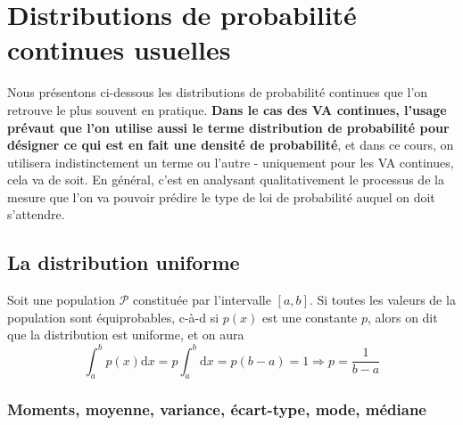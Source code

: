 \section{Distributions de probabilité continues usuelles}

Nous présentons ci-dessous les distributions de probabilité continues que l'on retrouve le plus souvent en pratique. {\bf Dans le cas des VA continues, l'usage prévaut que l'on utilise aussi le terme distribution de probabilité pour désigner ce qui est en fait une densité de probabilité}, et dans ce cours, on utilisera indistinctement un terme ou l'autre - uniquement pour les VA continues, cela va de soit. En général, c'est en analysant qualitativement le processus de la mesure que l'on va pouvoir prédire le type de loi de probabilité auquel on doit s'attendre.

\subsection{La distribution uniforme}

Soit une population $\mathcal{P}$ constituée par l'intervalle $[a,b]$. Si toutes les valeurs de la population sont équiprobables, c-à-d si $p(x)$ est une constante $p$, alors on dit que la distribution est uniforme, et on aura
\begin{equation}
\int_a^b p(x)\text{d}x=p\int_a^b\text{d}x=p(b-a)=1\Longrightarrow p=\frac{1}{b-a}
\end{equation}

\subsubsection{Moments, moyenne, variance, écart-type, mode, médiane}

